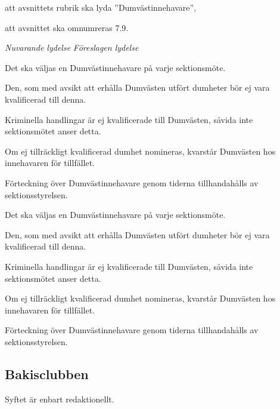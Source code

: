 \documentclass{article}
\newenvironment{lydelse}
    {\begin{paracol}{2}%
        \emph{Nuvarande lydelse}%
        \switchcolumn%
        \emph{Föreslagen lydelse}%
    \end{paracol}%
    \begin{enumerate}[label=\thesubsection.\arabic*]%
    \begin{paracol}{2}%
    }{\end{paracol}\end{enumerate}}
\begin{document}
\begin{dels}
    \item att avsnittets rubrik ska lyda ''Dumvästinnehavare'',
    \item att avsnittet ska omnumreras 7.9.
\end{dels}
\begin{lydelse}
    \setcounter{section}{8}
    \setcounter{subsection}{10}
    
	\item Det ska väljas en Dumvästinnehavare på varje sektionsmöte.

	\item Den, som med avsikt att erhålla Dumvästen utfört dumheter bör ej vara kvalificerad till denna.
	
	\item Kriminella handlingar är ej kvalificerade till Dumvästen, såvida inte sektionsmötet anser detta.
	
	\item Om ej tillräckligt kvalificerad dumhet nomineras, kvarstår Dumvästen hos innehavaren för tillfället.
	
	\item Förteckning över Dumvästinnehavare genom tiderna tillhandahålls av sektionsstyrelsen.
    
    \setcounter{section}{7}
    \setcounter{subsection}{9}
    \switchcolumn
    
    \item Det ska väljas en Dumvästinnehavare på varje sektionsmöte.
    
    \item Den, som med avsikt att erhålla Dumvästen utfört dumheter bör ej vara kvalificerad till denna.
    		
    \item Kriminella handlingar är ej kvalificerade till Dumvästen, såvida inte sektionsmötet anser detta.
    		
    \item Om ej tillräckligt kvalificerad dumhet nomineras, kvarstår Dumvästen hos innehavaren för tillfället.
    		
    \item Förteckning över Dumvästinnehavare genom tiderna tillhandahålls av sektionsstyrelsen.
    
\end{lydelse}

\subsection{Bakisclubben}
Syftet är enbart redaktionellt.
\end{document}
